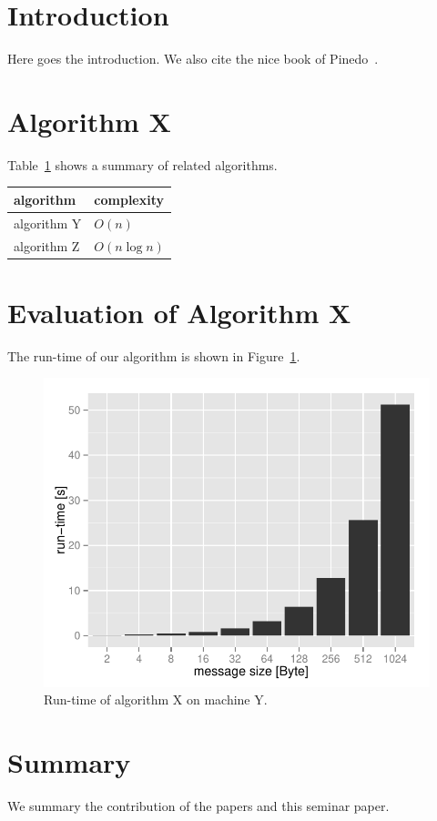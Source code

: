 
\section{Introduction}

Here goes the introduction. We also cite the nice book of Pinedo~\cite{calciu_adaptive_2014,bar-nissan_dynamic_2011,hendler_flat_2010,lotan_skiplist-based_2000,sundell_fast_2003}.

\section{Algorithm X}

Table~\ref{tab:related_algorithms} shows a summary of related algorithms.

\begin{table}[t]
\centering
{}
\label{tab:related_algorithms}
\begin{tabular}{ll}
\toprule 
algorithm & complexity \\
\midrule
algorithm Y & $O(n)$ \\
algorithm Z & $O(n \log{n} )$ \\
\bottomrule
\end{tabular}
\end{table}

\section{Evaluation of Algorithm X}

The run-time of our algorithm is shown in Figure~\ref{fig:runtime}.

\begin{figure}[t]
\centering
\includegraphics[width=.5\linewidth]{figures/runtime}
\caption{Run-time of algorithm X on machine Y.}
\label{fig:runtime}
\end{figure}

\section{Summary}
We summary the contribution of the papers and this seminar paper.
